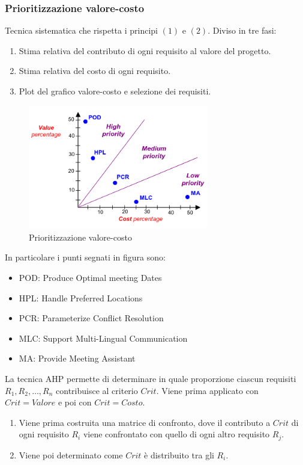 \documentclass[../main.tex]{subfiles}
\begin{document}
\subsubsection{Prioritizzazione valore-costo}
Tecnica sistematica che rispetta i principi $(1)$ e $(2)$.
Diviso in tre fasi:
\begin{enumerate}
	\item Stima relativa del contributo di ogni requisito al valore del progetto.
	\item Stima relativa del costo di ogni requisito.
	\item Plot del grafico valore-costo e selezione dei requisiti.
\end{enumerate}
\begin{figure}[h]
	\centering
	\includegraphics[width=0.7\textwidth]{pictures/GraficoCostoValore.png}
	\caption{Prioritizzazione valore-costo}
\end{figure}
In particolare i punti segnati in figura sono:
\begin{itemize}
	\item POD: Produce Optimal meeting Dates
	\item HPL: Handle Preferred Locations
	\item PCR: Parameterize Conflict Resolution
	\item MLC: Support Multi-Lingual Communication
	\item MA: Provide Meeting Assistant
\end{itemize}
La tecnica AHP permette di determinare in quale proporzione ciascun requisiti $R_1, R_2, \ldots, R_n$ contribuisce al criterio $Crit$.
Viene prima applicato con $Crit=Valore$ e poi con $Crit=Costo$.
\begin{enumerate}
	\item Viene prima costruita una matrice di confronto, dove il contributo a $Crit$ di ogni requisito $R_i$ viene confrontato con quello di ogni altro requisito $R_j$.
	\item Viene poi determinato come $Crit$ è distribuito tra gli $R_i$.
\end{enumerate}
\end{document}

